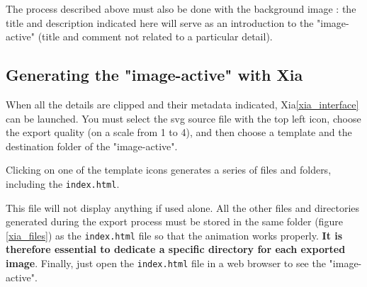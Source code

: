 The process described above must also be done with the background image : 
the title and description indicated here will serve as an introduction to 
the "image-active" (title and comment not related to a particular detail).

\subsection{Generating the "image-active" with Xia}

When all the details are clipped and their metadata indicated, Xia\ref{xia_interface} can be launched. You must select the svg source file with the top left icon,
choose the export quality (on a scale from 1 to 4), and then choose a 
template and the destination folder of the "image-active".

Clicking on one of the template icons generates a series of files and folders, including the \texttt{index.html}.

\begin{alerte}
This file will not display anything if used 
alone. All the other files and directories generated during the export process 
must be stored in  the same folder (figure \ref{xia_files}) as the \texttt{index.html} file so that the animation works properly. \textbf{It is therefore essential to 
dedicate a specific directory for each exported image}. Finally, just open 
the \texttt{index.html} file in a web browser to see the "image-active".
\end{alerte}

